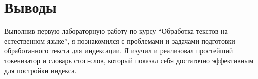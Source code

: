 \section{Выводы}

Выполнив первую лабораторную работу по курсу \enquote{Обработка текстов на естественном языке}, я познакомился с проблемами и задачами подготовки обработанного текста для индексации. Я изучил и реализовал простейший токенизатор и словарь стоп-слов, который показал себя достаточно эффективным для постройки индекса.

\pagebreak
